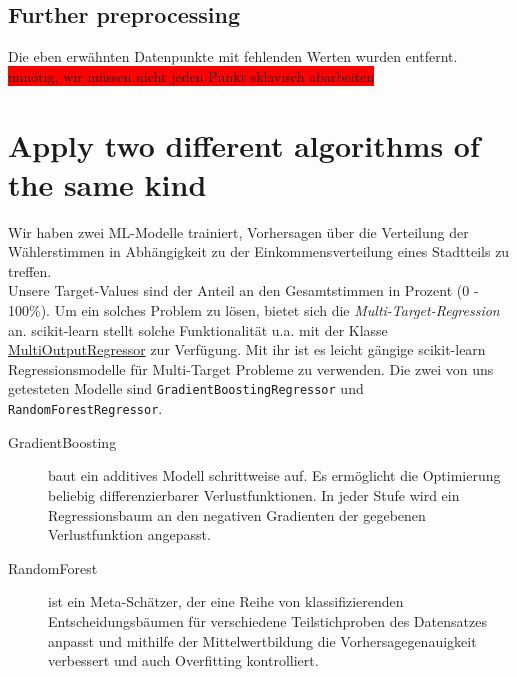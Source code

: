 \documentclass[a4paper,10pt]{scrartcl}
\begin{document}
\subsection{Further preprocessing}
Die eben erwähnten Datenpunkte mit fehlenden Werten wurden entfernt. \\ 
\colorbox{red}{unnötig, wir müssen nicht jeden Punkt sklavisch abarbeiten}


\section{Apply two different algorithms of the same kind}
Wir haben zwei ML-Modelle trainiert, Vorhersagen über die Verteilung der Wählerstimmen in Abhängigkeit zu der Einkommensverteilung eines Stadtteils zu treffen.\\
Unsere Target-Values sind der Anteil an den Gesamtstimmen in Prozent (0 - 100\%). Um ein solches Problem zu lösen, bietet sich die  \textit{Multi-Target-Regression} an. scikit-learn stellt solche Funktionalität u.a. mit der Klasse \href{https://scikit-learn.org/stable/modules/generated/sklearn.multioutput.MultiOutputRegressor.html}{MultiOutputRegressor} zur Verfügung. Mit ihr ist es leicht gängige scikit-learn Regressionsmodelle für Multi-Target Probleme zu verwenden. Die zwei von uns getesteten Modelle sind \lstinline|GradientBoostingRegressor| und \lstinline|RandomForestRegressor|.
\begin{description}
	\item[GradientBoosting] baut ein additives Modell schrittweise auf. Es ermöglicht die Optimierung beliebig differenzierbarer Verlustfunktionen. In jeder Stufe wird ein Regressionsbaum an den negativen Gradienten der gegebenen Verlustfunktion angepasst.
	\item[RandomForest] ist ein Meta-Schätzer, der eine Reihe von klassifizierenden Entscheidungsbäumen für verschiedene Teilstichproben des Datensatzes anpasst und mithilfe der Mittelwertbildung die Vorhersagegenauigkeit verbessert und auch Overfitting kontrolliert.	 
\end{description}
\end{document}
